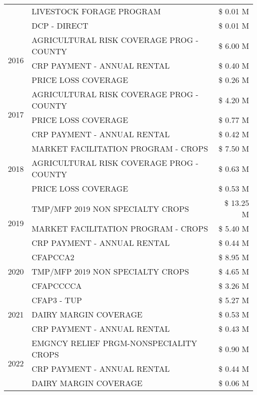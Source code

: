 \begin{tabular}{llr}
 & LIVESTOCK FORAGE PROGRAM & \$ 0.01 M \\
 & DCP - DIRECT & \$ 0.01 M \\
\cline{1-3}
\multirow[t]{3}{*}{2016} & AGRICULTURAL RISK COVERAGE PROG - COUNTY & \$ 6.00 M \\
 & CRP PAYMENT - ANNUAL RENTAL & \$ 0.40 M \\
 & PRICE LOSS COVERAGE & \$ 0.26 M \\
\cline{1-3}
\multirow[t]{3}{*}{2017} & AGRICULTURAL RISK COVERAGE PROG - COUNTY & \$ 4.20 M \\
 & PRICE LOSS COVERAGE & \$ 0.77 M \\
 & CRP PAYMENT - ANNUAL RENTAL & \$ 0.42 M \\
\cline{1-3}
\multirow[t]{3}{*}{2018} & MARKET FACILITATION PROGRAM - CROPS & \$ 7.50 M \\
 & AGRICULTURAL RISK COVERAGE PROG - COUNTY & \$ 0.63 M \\
 & PRICE LOSS COVERAGE & \$ 0.53 M \\
\cline{1-3}
\multirow[t]{3}{*}{2019} & TMP/MFP 2019 NON SPECIALTY CROPS & \$ 13.25 M \\
 & MARKET FACILITATION PROGRAM - CROPS & \$ 5.40 M \\
 & CRP PAYMENT - ANNUAL RENTAL & \$ 0.44 M \\
\cline{1-3}
\multirow[t]{3}{*}{2020} & CFAPCCA2 & \$ 8.95 M \\
 & TMP/MFP 2019 NON SPECIALTY CROPS & \$ 4.65 M \\
 & CFAPCCCCA & \$ 3.26 M \\
\cline{1-3}
\multirow[t]{3}{*}{2021} & CFAP3 - TUP & \$ 5.27 M \\
 & DAIRY MARGIN COVERAGE & \$ 0.53 M \\
 & CRP PAYMENT - ANNUAL RENTAL & \$ 0.43 M \\
\cline{1-3}
\multirow[t]{3}{*}{2022} & EMGNCY RELIEF PRGM-NONSPECIALITY CROPS & \$ 0.90 M \\
 & CRP PAYMENT - ANNUAL RENTAL & \$ 0.44 M \\
 & DAIRY MARGIN COVERAGE & \$ 0.06 M \\
\cline{1-3}
\bottomrule
\end{tabular}
